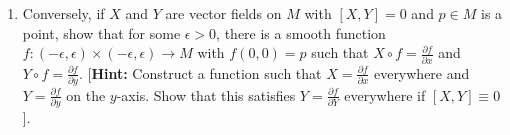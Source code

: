\documentclass[12pt]{article}
\newcommand{\del}{\partial}
\begin{document}
\begin{enumerate}
\item Conversely, if $X$ and $Y$ are vector fields on $M$ with $[X,Y]=0$ and $p\in M$ is a point, show that for some $\epsilon>0$, there is a smooth function $f:(-\epsilon,\epsilon)\times (-\epsilon,\epsilon)\to M$ with $f(0,0)=p$ such that $X\circ f=\frac{\del f}{\del x}$ and $Y\circ f=\frac{\del f}{\del y}$. [\textbf{Hint:} Construct a function such that $X=\frac{\del f}{\del x}$ everywhere and $Y=\frac{\del f}{\del y}$ on the $y$-axis. Show that this satisfies $Y=\frac{\del f}{\del Y}$ everywhere if $[X,Y]\equiv 0$].

\end{enumerate}
\end{document}
